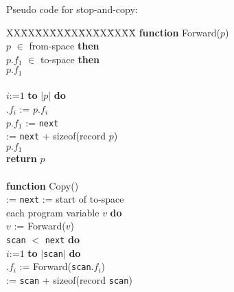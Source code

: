 \begin{slide*}
Pseudo code for stop-and-copy:

\begin{tabbing}
XX\=XX\=XX\=XX\=XX\=XX\=XX\=XX\=XX\=\kill
{\bf function} Forward($p$)\\
 $p$ $\in$ from-space {\bf then}\\
\> $p.f_1$ $\in$ to-space {\bf then}\\
\>\> $p.f_1$\\
\>\\
\>\> $i$:=$1$ {\bf to} $|p|$ {\bf do}\\
\>\>\>.$f_i$ := $p.f_i$\\
\>\>\>$p.f_1$ := {\tt next}\\
\>\> := {\tt next} + sizeof(record $p$)\\
\>\> $p.f_1$\\
 {\bf return} $p$\\
\\
{\bf function} Copy()\\
 := {\tt next} := start of to-space\\
 each program variable $v$ {\bf do}\\
\>\>$v$ := Forward($v$)\\
 {\tt scan} $<$ {\tt next} {\bf do}\\
\> $i$:=$1$ {\bf to} $|${\tt scan}$|$ {\bf do}\\
\>\>$.f_i$ := Forward({\tt scan}$.f_i$)\\
\> := {\tt scan} + sizeof(record {\tt scan})
\end{tabbing}
\vfil
\end{slide*}
 
